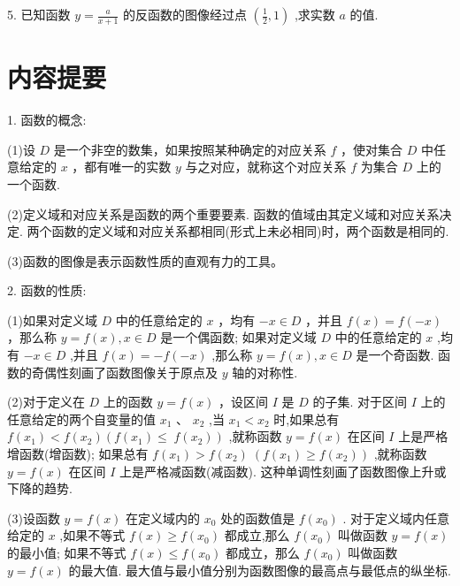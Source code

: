 \documentclass[10pt]{article}
\begin{document}
5. 已知函数 \(y = \frac{a}{x + 1}\) 的反函数的图像经过点 \(\left( {\frac{1}{2},1}\right)\) ,求实数 \(a\) 的值.

\section*{}

\section*{内容提要}

1. 函数的概念:

(1)设 \(D\) 是一个非空的数集，如果按照某种确定的对应关系 \(f\) ，使对集合 \(D\) 中任意给定的 \(x\) ，都有唯一的实数 \(y\) 与之对应，就称这个对应关系 \(f\) 为集合 \(D\) 上的一个函数.

(2)定义域和对应关系是函数的两个重要要素. 函数的值域由其定义域和对应关系决定. 两个函数的定义域和对应关系都相同(形式上未必相同)时，两个函数是相同的.

(3)函数的图像是表示函数性质的直观有力的工具。

2. 函数的性质:

(1)如果对定义域 \(D\) 中的任意给定的 \(x\) ，均有 \(- x \in  D\) ，并且 \(f\left( x\right)  = f\left( {-x}\right)\) ，那么称 \(y = f\left( x\right) ,x \in  D\) 是一个偶函数; 如果对定义域 \(D\) 中的任意给定的 \(x\) ,均有 \(- x \in  D\) ,并且 \(f\left( x\right)  =  - f\left( {-x}\right)\) ,那么称 \(y = f\left( x\right) ,x \in  D\) 是一个奇函数. 函数的奇偶性刻画了函数图像关于原点及 \(y\) 轴的对称性.

(2)对于定义在 \(D\) 上的函数 \(y = f\left( x\right)\) ，设区间 \(I\) 是 \(D\) 的子集. 对于区间 \(I\) 上的任意给定的两个自变量的值 \({x}_{1}\text{ 、 }{x}_{2}\) ,当 \({x}_{1} < {x}_{2}\) 时,如果总有 \(f\left( {x}_{1}\right)  < f\left( {x}_{2}\right) \left( {f\left( {x}_{1}\right)  \leq  }\right. \; \left. {f\left( {x}_{2}\right) }\right)\) ,就称函数 \(y = f\left( x\right)\) 在区间 \(I\) 上是严格增函数(增函数); 如果总有 \(f\left( {x}_{1}\right)  > f\left( {x}_{2}\right) \; \left( {f\left( {x}_{1}\right)  \geq  f\left( {x}_{2}\right) }\right)\) ,就称函数 \(y = f\left( x\right)\) 在区间 \(I\) 上是严格减函数(减函数). 这种单调性刻画了函数图像上升或下降的趋势.

(3)设函数 \(y = f\left( x\right)\) 在定义域内的 \({x}_{0}\) 处的函数值是 \(f\left( {x}_{0}\right)\) . 对于定义域内任意给定的 \(x\) ,如果不等式 \(f\left( x\right)  \geq  f\left( {x}_{0}\right)\) 都成立,那么 \(f\left( {x}_{0}\right)\) 叫做函数 \(y = f\left( x\right)\) 的最小值; 如果不等式 \(f\left( x\right)  \leq  f\left( {x}_{0}\right)\) 都成立，那么 \(f\left( {x}_{0}\right)\) 叫做函数 \(y = f\left( x\right)\) 的最大值. 最大值与最小值分别为函数图像的最高点与最低点的纵坐标.
\end{document}
